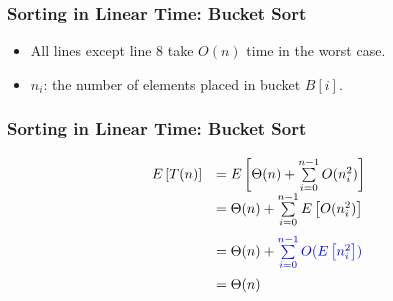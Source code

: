\documentclass[UTF8,11pt,handout]{beamer}
\begin{document}
\begin{frame}
\frametitle{Sorting in Linear Time: Bucket Sort}
	\begin{center}
	\end{center}
\begin{itemize}
	\item All lines except line 8 take {\color{blue}$O(n)$} time in the worst case. 
	\item  {\color{blue}$n_i$}: the number of elements placed in bucket $B\left[i\right]$.
\end{itemize}
\end{frame}

\begin{frame}
\frametitle{Sorting in Linear Time: Bucket Sort}
\[
\begin{array}{ll}
E\left[T(n)\right]&=E\left[\Theta(n)+\sum\limits_{i=0}^{n-1}{O(n_i^2)}\right]\\\vspace{0.2cm}
&=\Theta(n)+\sum\limits_{i=0}^{n-1}{E\left[O(n_i^2)\right]}\\\vspace{0.2cm}
&=\Theta(n)+{\color{blue}\sum\limits_{i=0}^{n-1}{O(E\left[n_i^2\right])}}\\\vspace{0.2cm}
&=\Theta(n)
\end{array}
\]
\begin{center}
	\pause{}
	
	 	
\end{center}
\end{frame}
\end{document}
